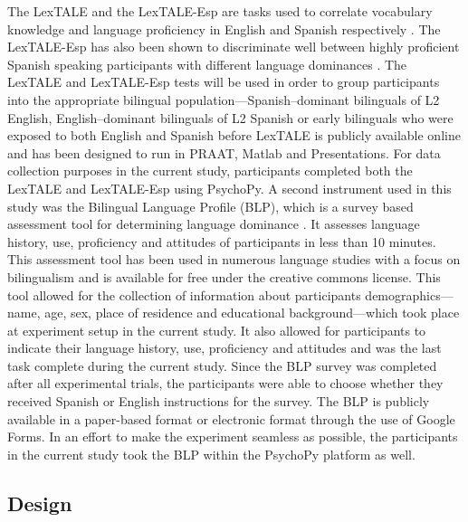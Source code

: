 \documentclass[
12pt, %
english, %
doublespacing, %
nolistspacing, %
liststotoc, %
headsepline, %
chapterinoneline, %
openany, %
]{DoctoralThesis}\usepackage[]{graphicx}\usepackage[]{color}
\begin{document}
The LexTALE and the LexTALE-Esp are tasks used to correlate vocabulary knowledge and language proficiency in English and Spanish respectively \parencite{Izura2014-yw,Lemhofer2012-hz}. The LexTALE-Esp has also been shown to discriminate well between highly proficient Spanish speaking participants with different language dominances \parencite{Ferre2017-jq}. The LexTALE and LexTALE-Esp tests will be used in order to group participants into the appropriate bilingual population—Spanish–dominant bilinguals of L2 English, English–dominant bilinguals of L2 Spanish or early bilinguals who were exposed to both English and Spanish before %
LexTALE is publicly available online and has been designed to run in PRAAT, Matlab and Presentations. For data collection purposes in the current study, participants completed both the LexTALE and LexTALE-Esp using PsychoPy. 
A second instrument used in this study was the Bilingual Language Profile (BLP), which is a survey based assessment tool for determining language dominance \parencite{Birdsong2012-wd}. It assesses language history, use, proficiency and attitudes of participants in less than 10 minutes. This assessment tool has been used in numerous language studies with a focus on bilingualism and is available for free under the creative commons license. This tool allowed for the collection of information about participants demographics---name, age, sex, place of residence and educational background---which took place at experiment setup in the current study. It also allowed for participants to indicate their language history, use, proficiency and attitudes and was the last task complete during the current study. Since the BLP survey was completed after all experimental trials, the participants were able to choose whether they received Spanish or English instructions for the survey. The BLP is publicly available in a paper-based format or electronic format through the use of Google Forms. In an effort to make the experiment seamless as possible, the participants in the current study took the BLP within the PsychoPy platform as well. 



\subsection{Design}
\end{document}
